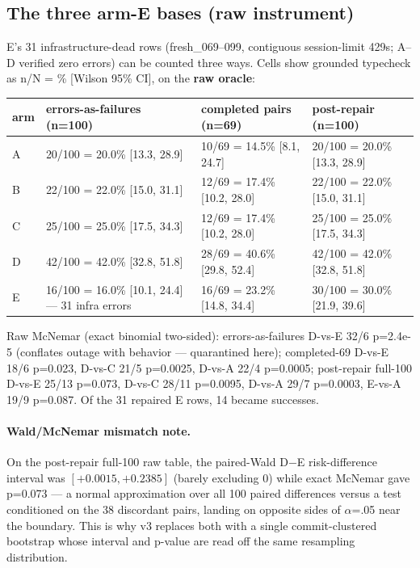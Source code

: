 \documentclass[10pt]{article}
\begin{document}
\subsection{The three arm-E bases (raw instrument)}\label{s2:bases}

E's 31 infrastructure-dead rows (fresh\_069--099, contiguous
session-limit 429s; A--D verified zero errors) can be counted three
ways. Cells show grounded typecheck as n/N = \% [Wilson 95\% CI], on
the \textbf{raw oracle}:

\begin{center}\footnotesize
\begin{tabular}{@{}llll@{}}
\toprule
arm & errors-as-failures (n=100) & completed pairs (n=69) & post-repair (n=100) \\
\midrule
A & 20/100 = 20.0\% [13.3, 28.9] & 10/69 = 14.5\% [8.1, 24.7] & 20/100 = 20.0\% [13.3, 28.9] \\
B & 22/100 = 22.0\% [15.0, 31.1] & 12/69 = 17.4\% [10.2, 28.0] & 22/100 = 22.0\% [15.0, 31.1] \\
C & 25/100 = 25.0\% [17.5, 34.3] & 12/69 = 17.4\% [10.2, 28.0] & 25/100 = 25.0\% [17.5, 34.3] \\
D & 42/100 = 42.0\% [32.8, 51.8] & 28/69 = 40.6\% [29.8, 52.4] & 42/100 = 42.0\% [32.8, 51.8] \\
E & 16/100 = 16.0\% [10.1, 24.4] --- 31 infra errors & 16/69 = 23.2\% [14.8, 34.4] & 30/100 = 30.0\% [21.9, 39.6] \\
\bottomrule
\end{tabular}
\end{center}

Raw McNemar (exact binomial two-sided): errors-as-failures D-vs-E 32/6
p=2.4e-5 (conflates outage with behavior --- quarantined here);
completed-69 D-vs-E 18/6 p=0.023, D-vs-C 21/5 p=0.0025, D-vs-A 22/4
p=0.0005; post-repair full-100 D-vs-E 25/13 p=0.073, D-vs-C 28/11
p=0.0095, D-vs-A 29/7 p=0.0003, E-vs-A 19/9 p=0.087. Of the 31 repaired
E rows, 14 became successes.

\paragraph{Wald/McNemar mismatch note.} On the post-repair full-100 raw
table, the paired-Wald D$-$E risk-difference interval was
$[+0.0015, +0.2385]$ (barely excluding 0) while exact McNemar gave
p=0.073 --- a normal approximation over all 100 paired differences
versus a test conditioned on the 38 discordant pairs, landing on
opposite sides of $\alpha$=.05 near the boundary. This is why v3
replaces both with a single commit-clustered bootstrap whose interval
and p-value are read off the same resampling distribution.
\end{document}
